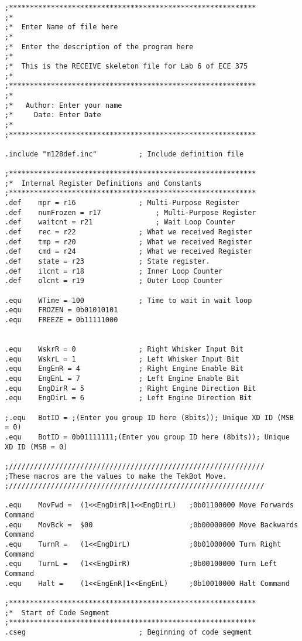 \documentclass[12pt,letterpaper]{article}
\begin{document}
\begin{verbatim}
;***********************************************************
;*
;*	Enter Name of file here
;*
;*	Enter the description of the program here
;*
;*	This is the RECEIVE skeleton file for Lab 6 of ECE 375
;*
;***********************************************************
;*
;*	 Author: Enter your name
;*	   Date: Enter Date
;*
;***********************************************************

.include "m128def.inc"			; Include definition file

;***********************************************************
;*	Internal Register Definitions and Constants
;***********************************************************
.def	mpr = r16				; Multi-Purpose Register
.def	numFrozen = r17				; Multi-Purpose Register
.def	waitcnt = r21				; Wait Loop Counter
.def	rec = r22				; What we received Register
.def	tmp = r20				; What we received Register
.def	cmd = r24				; What we received Register
.def	state = r23				; State register.
.def	ilcnt = r18				; Inner Loop Counter
.def	olcnt = r19				; Outer Loop Counter

.equ	WTime = 100				; Time to wait in wait loop
.equ    FROZEN = 0b01010101
.equ    FREEZE = 0b11111000


.equ	WskrR = 0				; Right Whisker Input Bit
.equ	WskrL = 1				; Left Whisker Input Bit
.equ	EngEnR = 4				; Right Engine Enable Bit
.equ	EngEnL = 7				; Left Engine Enable Bit
.equ	EngDirR = 5				; Right Engine Direction Bit
.equ	EngDirL = 6				; Left Engine Direction Bit

;.equ	BotID = ;(Enter you group ID here (8bits)); Unique XD ID (MSB = 0)
.equ	BotID = 0b01111111;(Enter you group ID here (8bits)); Unique XD ID (MSB = 0)

;/////////////////////////////////////////////////////////////
;These macros are the values to make the TekBot Move.
;/////////////////////////////////////////////////////////////

.equ	MovFwd =  (1<<EngDirR|1<<EngDirL)	;0b01100000 Move Forwards Command
.equ	MovBck =  $00						;0b00000000 Move Backwards Command
.equ	TurnR =   (1<<EngDirL)				;0b01000000 Turn Right Command
.equ	TurnL =   (1<<EngDirR)				;0b00100000 Turn Left Command
.equ	Halt =    (1<<EngEnR|1<<EngEnL)		;0b10010000 Halt Command

;***********************************************************
;*	Start of Code Segment
;***********************************************************
.cseg							; Beginning of code segment


\end{verbatim}
\end{document}
